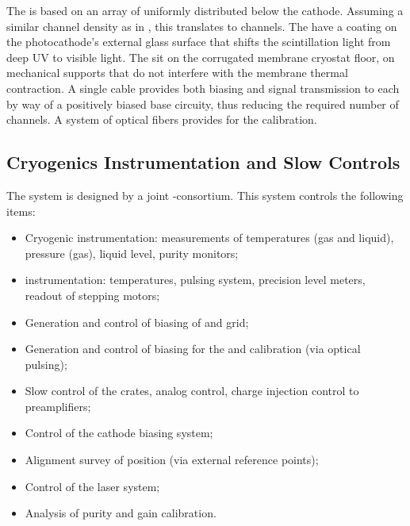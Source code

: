 The  is based on an array of  uniformly distributed below the cathode. Assuming a similar channel density as in , this translates to \dpnumpmtch channels. The  have a  coating on the photocathode's external glass surface that shifts the scintillation light from deep UV to visible light. The   sit on the corrugated membrane cryostat floor, on %
mechanical supports that do not interfere with the membrane thermal contraction. %
A single  cable provides both  biasing and signal transmission to each  by way of a positively biased base circuity, thus reducing the required number of \fdth{} channels.
A system of optical fibers provides for the  calibration.  


\subsection{Cryogenics Instrumentation and Slow Controls}
\label{v4:fddp-ov:sc}
The  system is designed by a joint \single{}-\dual consortium. %
This system controls the %
following items:

\begin{itemize}
\item Cryogenic instrumentation: measurements of temperatures (gas and liquid), pressure (gas), liquid level, purity monitors;
\item {} instrumentation: temperatures, pulsing system, precision level meters, readout of  stepping motors;
\item Generation and control of  biasing of  and grid;
\item Generation and control of  biasing for the  and calibration (via optical pulsing);
\item Slow control of the  crates, analog  control, charge injection control to preamplifiers;
\item Control of the cathode  biasing system;
\item Alignment survey of  position (via external reference points);
\item Control of the laser system;
\item Analysis of \lar purity and   gain calibration.
\end{itemize}

